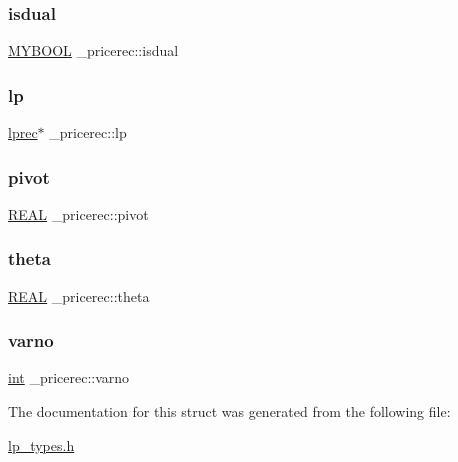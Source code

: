 \mbox{\label{struct__pricerec_a3ebb3f3e4c89ce4d90a9a3f9d4b514c6}} 
\subsubsection{\texorpdfstring{isdual}{isdual}}
{\footnotesize\ttfamily \hyperlink{lp__lib_8h_aad848328fb3018217ac9f01d97b6bd88}{M\+Y\+B\+O\+OL} \+\_\+pricerec\+::isdual}

\mbox{\label{struct__pricerec_a26cd2529023b3713e84154fdbc2cdd6a}} 
\subsubsection{\texorpdfstring{lp}{lp}}
{\footnotesize\ttfamily \hyperlink{lp__types_8h_afe42f1373b9ee8d824b5cad6a22d24c6}{lprec}$\ast$ \+\_\+pricerec\+::lp}

\mbox{\label{struct__pricerec_a2a7b29d997506a1f1b00264e2aa9d209}} 
\subsubsection{\texorpdfstring{pivot}{pivot}}
{\footnotesize\ttfamily \hyperlink{lp__lib_8h_a92bd5e363d131fa73669358edb232dce}{R\+E\+AL} \+\_\+pricerec\+::pivot}

\mbox{\label{struct__pricerec_aaa30bfbde8c7aa8d9564594af0173315}} 
\subsubsection{\texorpdfstring{theta}{theta}}
{\footnotesize\ttfamily \hyperlink{lp__lib_8h_a92bd5e363d131fa73669358edb232dce}{R\+E\+AL} \+\_\+pricerec\+::theta}

\mbox{\label{struct__pricerec_a73e4fd44e1cf3d74d1fbdfcf660a3f59}} 
\subsubsection{\texorpdfstring{varno}{varno}}
{\footnotesize\ttfamily \hyperlink{lp__lib_8h_adeb9ec6400320e4923ac9d836d509ddb}{int} \+\_\+pricerec\+::varno}



The documentation for this struct was generated from the following file\+:\begin{DoxyCompactItemize}
\item 
\hyperlink{lp__types_8h}{lp\+\_\+types.\+h}\end{DoxyCompactItemize}
